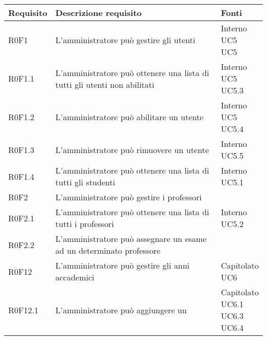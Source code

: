 \documentclass[AnalisiDeiRequisiti.tex]{subfiles}
\begin{document}
\label{table:Tabella di tracciamento requisiti-fonti}
\renewcommand*{\arraystretch}{1.2}
\begin{longtable}[H]{p{2cm}p{5.2cm}p{5cm}}
	\rowcolor{CHeader} 
	\color{CHeaderText} \textbf{Requisito} & \color{CHeaderText} \textbf{Descrizione requisito} & \color{CHeaderText} \textbf{Fonti} \\  
	\endhead
	R0F1 &  L'amministratore può gestire gli utenti & \makecell[tl]{
		Interno \\
		UC5 \\
		UC5
	} \\  
	R0F1.1 &  L'amministratore può ottenere una lista di tutti gli utenti non abilitati & \makecell[tl]{
		Interno \\ 
		UC5 \\  
		UC5.3
	} \\  
	R0F1.2 &  L'amministratore può abilitare un utente & \makecell[tl]{
		Interno \\ 
		UC5 \\ 
		UC5.4
	} \\  
	R0F1.3 &  L'amministratore può rimuovere un utente & \makecell[tl]{
		Interno \\ 
		UC5.5
	} \\  
	R0F1.4 &  L'amministratore può ottenere una lista di tutti gli studenti & \makecell[tl]{
		Interno \\  
		UC5.1
	} \\  
	R0F2 &  L'amministratore può gestire i professori & \makecell[tl]{
		Interno
	} \\  
	R0F2.1 &  L'amministratore può ottenere una lista di tutti i professori & \makecell[tl]{
		Interno \\ 
		UC5.2 
	} \\  
	R0F2.2 &  L'amministratore può assegnare un esame ad un determinato professore & \makecell[tl]{
		Capitolato
	} \\  
	R0F12&  L'amministratore può gestire gli anni accademici & \makecell[tl]{
		Capitolato \\ 
		UC6
	} \\  
	R0F12.1 &  L'amministratore può aggiungere un \citGloss{anno accademico} & \makecell[tl]{
		Capitolato \\ 
		UC6.1 \\ 
		UC6.3 \\ 
		UC6.4 \\ 
}
\end{longtable}
\end{document}
